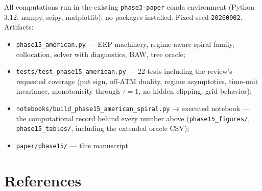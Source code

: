 \documentclass[
  english,
  10pt,
  letterpaper,
  DIV=11,
  numbers=noendperiod]{scrartcl}
\providecommand{\tightlist}{%
  \setlength{\itemsep}{0pt}\setlength{\parskip}{0pt}}
\begin{document}
All computations run in the existing \texttt{phase3-paper} conda
environment (Python 3.12, numpy, scipy, matplotlib); no packages
installed. Fixed seed \texttt{20260902}. Artifacts:

\begin{itemize}
\tightlist
\item
  \texttt{phase15\_american.py} --- EEP machinery, regime-aware spiral
  family, collocation, solver with diagnostics, BAW, tree oracle;
\item
  \texttt{tests/test\_phase15\_american.py} --- 22 tests including the
  review's requested coverage (put sign, off-ATM duality, regime
  asymptotics, time-unit invariance, monotonicity through \(\tau=1\), no
  hidden clipping, grid behavior);
\item
  \texttt{notebooks/build\_phase15\_american\_spiral.py} → executed
  notebook --- the computational record behind every number above
  (\texttt{phase15\_figures/}, \texttt{phase15\_tables/}, including the
  extended oracle CSV);
\item
  \texttt{paper/phase15/} --- this manuscript.
\end{itemize}

\section*{References}\label{references}
\end{document}
